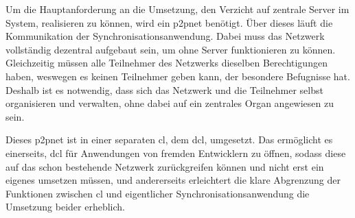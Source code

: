 
Um die Hauptanforderung an die Umsetzung, den Verzicht auf zentrale Server im System, realisieren zu können,
wird ein \gls{p2pnet} benötigt. Über dieses läuft die Kommunikation der Synchronisationsanwendung.
Dabei muss das Netzwerk vollständig dezentral aufgebaut sein, um ohne Server funktionieren zu können.
Gleichzeitig müssen alle Teilnehmer des Netzwerks dieselben Berechtigungen haben, weswegen es keinen
Teilnehmer geben kann, der besondere Befugnisse hat. Deshalb ist es notwendig, dass sich das Netzwerk
und die Teilnehmer selbst organisieren und verwalten, ohne dabei auf ein zentrales Organ angewiesen
zu sein.

Dieses \gls{p2pnet} ist in einer separaten \gls{cl}, dem \gls{dcl}, umgesetzt.
Das ermöglicht es einerseits, \gls{dcl} für Anwendungen von fremden Entwicklern zu öffnen, sodass diese auf das schon bestehende Netzwerk
zurückgreifen können und nicht erst ein eigenes umsetzen müssen, und andererseits erleichtert die klare Abgrenzung der Funktionen
zwischen \gls{cl} und eigentlicher Synchronisationsanwendung die Umsetzung beider erheblich.
